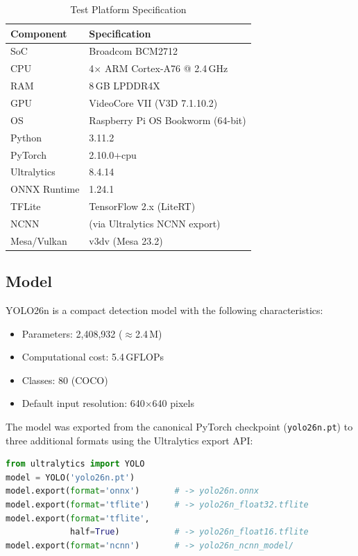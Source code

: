\documentclass[conference]{IEEEtran}
\begin{document}
\begin{table}[ht]
  \caption{Test Platform Specification}
  \label{tab:hardware}
  \centering
  \begin{tabular}{ll}
    \toprule
    \textbf{Component} & \textbf{Specification} \\
    \midrule
    SoC & Broadcom BCM2712 \\
    CPU & 4$\times$ ARM Cortex-A76 @ 2.4\,GHz \\
    RAM & 8\,GB LPDDR4X \\
    GPU & VideoCore VII (V3D 7.1.10.2) \\
    OS & Raspberry Pi OS Bookworm (64-bit) \\
    Python & 3.11.2 \\
    PyTorch & 2.10.0+cpu \\
    Ultralytics & 8.4.14 \\
    ONNX Runtime & 1.24.1 \\
    TFLite & TensorFlow 2.x (LiteRT) \\
    NCNN & (via Ultralytics NCNN export) \\
    Mesa/Vulkan & v3dv (Mesa 23.2) \\
    \bottomrule
  \end{tabular}
\end{table}

\subsection{Model}

YOLO26n is a compact detection model with the following characteristics:

\begin{itemize}
  \item Parameters: 2,408,932 ($\approx$2.4\,M)
  \item Computational cost: 5.4\,GFLOPs
  \item Classes: 80 (COCO)
  \item Default input resolution: 640$\times$640 pixels
\end{itemize}

The model was exported from the canonical PyTorch checkpoint
(\texttt{yolo26n.pt}) to three additional formats using the Ultralytics
export API:

\begin{lstlisting}[language=Python, caption={Format export via Ultralytics}]
from ultralytics import YOLO
model = YOLO('yolo26n.pt')
model.export(format='onnx')       # -> yolo26n.onnx
model.export(format='tflite')     # -> yolo26n_float32.tflite
model.export(format='tflite',
             half=True)           # -> yolo26n_float16.tflite
model.export(format='ncnn')       # -> yolo26n_ncnn_model/
\end{lstlisting}
\end{document}
